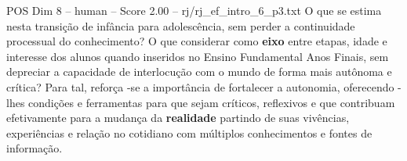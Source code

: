 \begin{textsample}{POS Dim 8 – human – Score 2.00 – rj/rj\_ef\_intro\_6\_p3.txt}  \label{ex:f8_pos_015}
O que se estima nesta transição de infância para adolescência, sem perder a continuidade processual do conhecimento?
O que considerar como \textbf{eixo} entre etapas, idade e interesse dos alunos quando inseridos no Ensino Fundamental Anos Finais, sem depreciar a capacidade de interlocução com o mundo de forma mais autônoma e crítica?
Para tal, reforça -se a importância de fortalecer a autonomia, oferecendo -lhes condições e ferramentas para que sejam críticos, reflexivos e que contribuam efetivamente para a mudança da \textbf{realidade} partindo de suas vivências, experiências e relação no cotidiano com múltiplos conhecimentos e fontes de informação.

\end{textsample}
